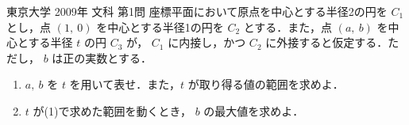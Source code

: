 \documentclass[a4paper]{ltjsarticle}
\begin{document}

\begin{itembox}[l]{東京大学 2009年 文科 第1問}
    座標平面において原点を中心とする半径2の円を $C_1$ とし，点 $(1,\ 0)$ を中心とする半径1の円を $C_2$ とする．また，点 $(a,\ b)$ を中心とする半径 $t$ の円 $C_3$ が， $C_1$ に内接し，かつ $C_2$ に外接すると仮定する．ただし， $b$ は正の実数とする．

    \begin{enumerate}[label=(\arabic*)]
        \item $a,\ b$ を $t$ を用いて表せ．また，$t$ が取り得る値の範囲を求めよ．

        \item $t$ が(1)で求めた範囲を動くとき， $b$ の最大値を求めよ．
    \end{enumerate}
\end{itembox}
\end{document}
